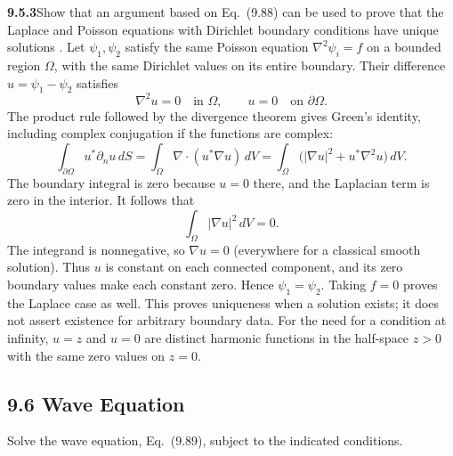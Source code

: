 \par\bigskip
\noindent\textbf{9.5.3}\quad Show that an argument based on Eq.~(9.88) can be
used to prove that the Laplace and Poisson equations with Dirichlet boundary
conditions have unique solutions .
\solution
{}
Let $\psi_1,\psi_2$ satisfy the same Poisson equation
$\nabla^2\psi_i=f$ on a bounded region $\Omega$, with the same
Dirichlet values on its entire boundary.  Their difference
$u=\psi_1-\psi_2$ satisfies
\[
\nabla^2u=0\quad\text{in }\Omega,\qquad
u=0\quad\text{on }\partial\Omega.
\]
The product rule followed by the divergence theorem gives Green's
identity, including complex conjugation if the functions are complex:
\[
\int_{\partial\Omega}u^*\partial_nu\,dS
=\int_\Omega\nabla\cdot(u^*\nabla u)\,dV
=\int_\Omega\bigl(|\nabla u|^2+u^*\nabla^2u\bigr)\,dV.
\]
The boundary integral is zero because $u=0$ there, and the Laplacian
term is zero in the interior.  It follows that
\[
\int_\Omega|\nabla u|^2\,dV=0.
\]
The integrand is nonnegative, so $\nabla u=0$ (everywhere for a
classical smooth solution).  Thus $u$ is constant on each connected
component, and its zero boundary values make each constant zero.
Hence $\psi_1=\psi_2$.  Taking $f=0$ proves the Laplace case as well.
This proves uniqueness when a solution exists; it does not assert
existence for arbitrary boundary data.
For the need for a condition at infinity, $u=z$ and $u=0$ are distinct
harmonic functions in the half-space $z>0$ with the same zero values
on $z=0$.


\subsection*{9.6 Wave Equation}

Solve the wave equation, Eq.~(9.89), subject to the indicated conditions.

